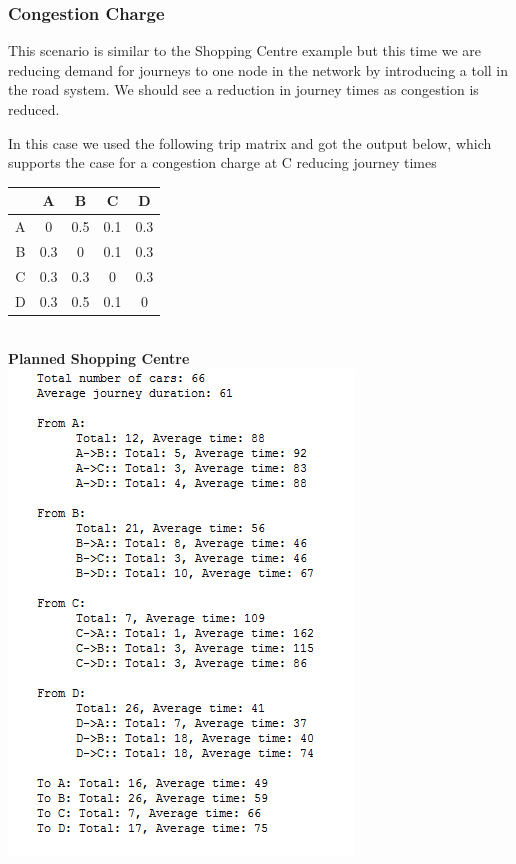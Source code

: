     
\subsubsection{Congestion Charge}
This scenario is similar to the Shopping Centre example but this time we are reducing demand for journeys to one node in the network by introducing a toll in the road system.  We should see a reduction in journey times as congestion is reduced.
   
    

In this case we used the following trip matrix and got the output below, which supports the case for a congestion charge at C reducing journey times
 \begin{center}
	\begin{tabular}{| c | c | c | c | c |}
		\hline
		\textbf{ }	&	A & B & C & D \\ \hline
		A				&	0 & 0.5 & 0.1 & 0.3				\\ \hline
		B					&	0.3 & 0 & 0.1 & 0.3				\\ \hline
		C	&	0.3 & 0.3 & 0 & 0.3			\\ \hline
		D				&	0.3 & 0.5 & 0.1 & 0				\\ \hline

		
	\end{tabular}
	\end{center}
~ \\ \textbf{Planned Shopping Centre}\\
    \includegraphics[scale=1.0]{./images/scenario3.png}
